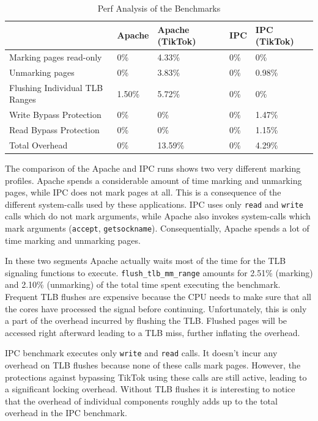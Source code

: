 \begin{table}[]
  \label{table:perf}
  \centering
  \begin{tabular}{|l|l|l|l|l|}
  \hline
                                 & Apache & Apache (TikTok) & IPC & IPC (TikTok)\\ \hline
  Marking pages read-only        & 0\%    & 4.33\%          & 0\% & 0\%         \\ \hline
  Unmarking pages                & 0\%    & 3.83\%          & 0\% & 0.98\%      \\ \hline
  Flushing Individual TLB Ranges & 1.50\% & 5.72\%          & 0\% & 0\%         \\ \hline
  Write Bypass Protection        & 0\%    & 0\%             & 0\% & 1.47\%      \\ \hline
  Read Bypass Protection         & 0\%    & 0\%             & 0\% & 1.15\%      \\ \hline
  Total Overhead                 & 0\%    & 13.59\%         & 0\% & 4.29\%      \\ \hline
  \end{tabular}
  \caption{Perf Analysis of the Benchmarks}
\end{table}

The comparison of the Apache and IPC runs shows two very different marking
profiles. Apache spends a considerable amount of time marking and unmarking
pages, while IPC does not mark pages at all. This is a consequence of the
different system-calls used by these applications. IPC uses only \texttt{read}
and \texttt{write} calls which do not mark arguments, while Apache also invokes
system-calls which mark arguments (\texttt{accept}, \texttt{getsockname}).
Consequentially, Apache spends a lot of time marking and unmarking pages.

In these two segments Apache actually waits most of the time for the TLB
signaling functions to execute. \texttt{flush\_tlb\_mm\_range} amounts for
2.51\% (marking) and 2.10\% (unmarking) of the total time spent executing the
benchmark. Frequent TLB flushes are expensive because the CPU needs to make sure
that all the cores have processed the signal before continuing. Unfortunately,
this is only a part of the overhead incurred by flushing the TLB. Flushed pages
will be accessed right afterward leading to a TLB miss, further inflating the
overhead.

IPC benchmark executes only \texttt{write} and \texttt{read} calls. It doesn't
incur any overhead on TLB flushes because none of these calls mark pages.
However, the protections against bypassing TikTok using these calls are still
active, leading to a significant locking overhead. Without TLB flushes it is
interesting to notice that the overhead of individual components roughly adds
up to the total overhead in the IPC benchmark.


